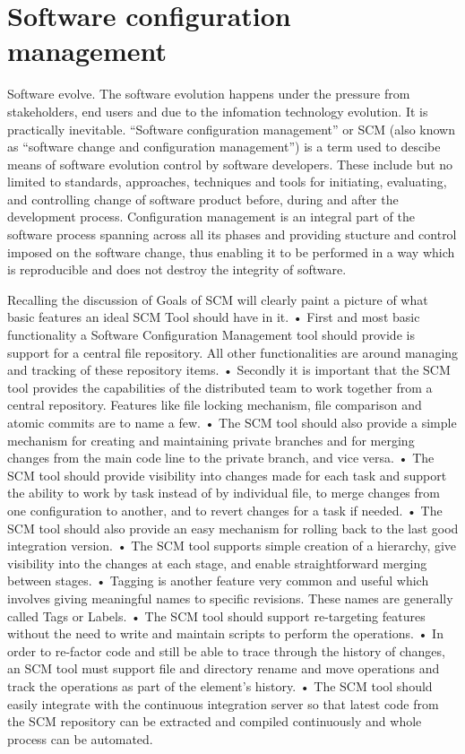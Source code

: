 \section{Software configuration management}
Software evolve. The software evolution happens under the pressure from stakeholders, end users and due to the infomation technology evolution. It is practically inevitable.
``Software configuration management'' or SCM (also known as ``software change and configuration management'') is a term used to descibe means of software evolution control by
software developers. These include but no limited to standards, approaches, techniques and tools for initiating, evaluating, and controlling change of software product before,
during and after the development process. Configuration management is an integral part of the software process spanning across all its phases and providing stucture and control
imposed on the software change, thus enabling it to be performed in a way which is reproducible and does not destroy the integrity of software.

Recalling the discussion of Goals of SCM will clearly paint a picture of what basic features an ideal SCM Tool should have in it.
•       First and most basic functionality a Software Configuration Management tool should provide is support for a central file repository. All other functionalities are around
managing and tracking of these repository items.
•       Secondly it is important that the SCM tool provides the capabilities of the distributed team to work together from a central repository. Features like file locking
mechanism, file comparison and atomic commits are to name a few.
•       The SCM tool should also provide a simple mechanism for creating and maintaining private branches and for merging changes from the main code line to the private branch, and
vice versa.
•       The SCM tool should provide visibility into changes made for each task and support the ability to work by task instead of by individual file, to merge changes from one
configuration to another, and to revert changes for a task if needed.
•       The SCM tool should also provide an easy mechanism for rolling back to the last good integration version.
•       The SCM tool supports simple creation of a hierarchy, give visibility into the changes at each stage, and enable straightforward merging between stages.
•       Tagging is another feature very common and useful which involves giving meaningful names to specific revisions. These names are generally called Tags or Labels.
•       The SCM tool should support re-targeting features without the need to write and maintain scripts to perform the operations.
•       In order to re-factor code and still be able to trace through the history of changes, an SCM tool must support file and directory rename and move operations and track the
operations as part of the element’s history.
•       The SCM tool should easily integrate with the continuous integration server so that latest code from the SCM repository can be extracted and compiled continuously and whole
process can be automated.


